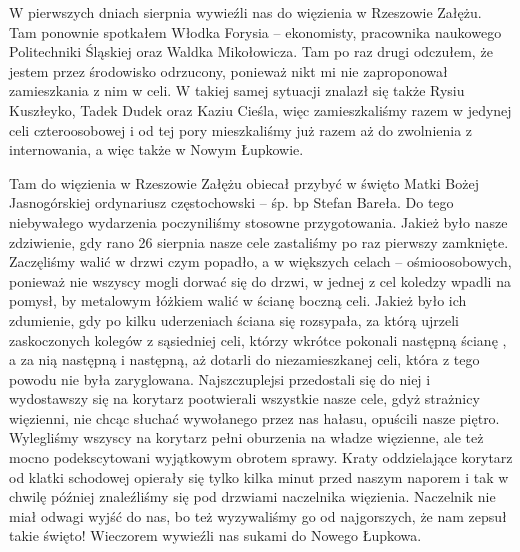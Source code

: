 W pierwszych dniach sierpnia wywieźli nas do więzienia w Rzeszowie Załężu. Tam ponownie spotkałem Włodka Forysia – ekonomisty, pracownika naukowego Politechniki Śląskiej oraz Waldka Mikołowicza. Tam po raz drugi odczułem, że jestem przez środowisko odrzucony, ponieważ nikt mi nie zaproponował zamieszkania z nim w celi. W takiej samej sytuacji znalazł się także Rysiu Kuszłeyko, Tadek Dudek oraz Kaziu Cieśla, więc zamieszkaliśmy razem w jedynej celi czteroosobowej i od tej pory mieszkaliśmy już razem aż do zwolnienia z internowania, a więc także w Nowym Łupkowie.

Tam do więzienia w Rzeszowie Załężu obiecał przybyć w święto Matki Bożej Jasnogórskiej ordynariusz częstochowski – śp. bp Stefan Bareła. Do tego niebywałego wydarzenia poczyniliśmy stosowne przygotowania. Jakież było nasze zdziwienie, gdy rano 26 sierpnia nasze cele zastaliśmy po raz pierwszy zamknięte. Zaczęliśmy walić w drzwi czym popadło, a w większych celach – ośmioosobowych, ponieważ nie wszyscy mogli dorwać się do drzwi, w jednej z cel koledzy wpadli na pomysł, by metalowym łóżkiem walić w ścianę boczną celi. Jakież było ich zdumienie, gdy po kilku uderzeniach ściana się rozsypała, za którą ujrzeli zaskoczonych kolegów z sąsiedniej celi, którzy wkrótce pokonali następną ścianę , a za nią następną i następną, aż dotarli do niezamieszkanej celi, która z tego powodu nie była zaryglowana. Najszczuplejsi przedostali się do niej i wydostawszy się na korytarz pootwierali wszystkie nasze cele, gdyż strażnicy więzienni, nie chcąc słuchać wywołanego przez nas hałasu, opuścili nasze piętro. Wylegliśmy wszyscy na korytarz pełni oburzenia na władze więzienne, ale też mocno podekscytowani wyjątkowym obrotem sprawy. Kraty oddzielające korytarz od klatki schodowej opierały się tylko kilka minut przed naszym naporem i tak w chwilę później znaleźliśmy się pod drzwiami naczelnika więzienia. Naczelnik nie miał odwagi wyjść do nas, bo też wyzywaliśmy go od najgorszych, że nam zepsuł takie święto! Wieczorem wywieźli nas sukami do Nowego Łupkowa.

